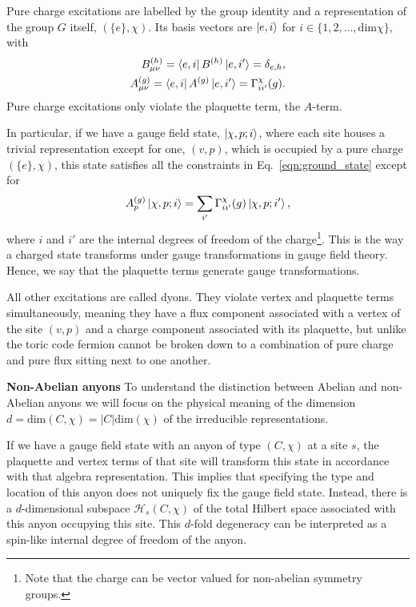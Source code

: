 \documentclass[two column]{article}
\begin{document}
Pure charge excitations are labelled by the group identity and a representation of the group $G$ itself, $(\{e\}, \chi)$. Its basis vectors are $\ket{e, i}$ for $i \in \{1, 2, \ldots, \text{dim}\chi\}$, with
\begin{equation}
    \begin{split}
        B^{(h)}_{\mu\nu}=\bra{e, i} B^{(h)} \ket{e, i'} = \delta_{e, h},\\
        A^{(g)}_{\mu\nu} = \bra{e, i} A^{(g)} \ket{e, i'} = \Gamma^\chi_{ii'}(g).
    \end{split}
\end{equation}
Pure charge excitations only violate the plaquette term, the $A$-term.


In particular, if we have a gauge field state, $\ket{\chi, p; i}$, where each site houses a trivial representation except for one, $(v, p)$, which is occupied by a pure charge $(\{e\}, \chi)$, this state satisfies all the constraints in Eq.~\eqref{eqn:ground_state} except for
\begin{equation}
    A_p^{(g)}\ket{\chi, p; i} = \sum_{i'} \Gamma^\chi_{ii'}(g)\ket{\chi, p; i'},\label{eqn:tranfs}
\end{equation}
where $i$ and $i'$ are the internal degrees of freedom of the charge\footnote{Note that the charge can be vector valued for non-abelian symmetry groups.}.
This is the way a charged state transforms under gauge transformations in gauge field theory. Hence, we say that the plaquette terms generate gauge transformations.

All other excitations are called dyons. They violate vertex and plaquette terms simultaneously, meaning they have a flux component associated with a vertex of the site $(v,p)$ and a charge component associated with its plaquette, but unlike the toric code fermion cannot be broken down to a combination of pure charge and pure flux sitting next to one another.

\textbf{Non-Abelian anyons} To understand the distinction between Abelian and non-Abelian anyons we will focus on the physical meaning of the dimension $d = \text{dim}(C, \chi) = |C|\text{dim}(\chi)$ of the irreducible representations.

If we have a gauge field state with an anyon of type $(C, \chi)$ at a site $s$, the plaquette and vertex terms of that site will transform this state in accordance with that algebra representation. This implies that specifying the type and location of this anyon does not uniquely fix the gauge field state. Instead, there is a $d$-dimensional subspace $\mathcal H_s(C,\chi)$ of the total Hilbert space associated with this anyon occupying this site. This $d$-fold degeneracy can be interpreted as a spin-like internal degree of freedom of the anyon.
\end{document}

